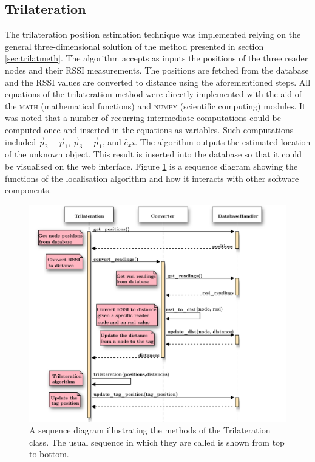 \subsection{Trilateration}
\label{subsec:trilatimpl}

The trilateration position estimation technique was implemented relying on the general three-dimensional solution of the method presented in section \ref{sec:trilatmeth}. The algorithm accepts as inputs the positions of the three reader nodes and their RSSI measurements. The positions are fetched from the database and the RSSI values are converted to distance using the aforementioned steps. All equations of the trilateration method were directly implemented with the aid of the \textsc{math} (mathematical functions) and \textsc{numpy} (scientific computing) modules. It was noted that a number of recurring intermediate computations could be computed once and inserted in the equations as variables. Such computations included $\vec p_2 - \vec p_1$, $\vec p_3 - \vec p_1$, and $\hat e_x i$. The algorithm outputs the estimated location of the unknown object. This result is inserted into the database so that it could be visualised on the web interface. Figure \ref{fig:seqtrilat} is a sequence diagram showing the functions of the localisation algorithm and how it interacts with other software components. 

\begin{figure}[h]
	\begin{center}
		\includegraphics[width=1\textwidth]{figures/seqdiag/trilat}
		\caption{A sequence diagram illustrating the methods of the \textsf{Trilateration} class. The usual sequence in which they are called is shown from top to bottom.}
		\label{fig:seqtrilat}
	\end{center}
\end{figure}


